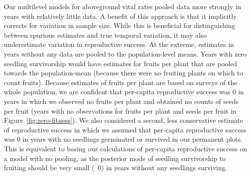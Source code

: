 \documentclass[12pt, oneside, titlepage]{article}   	%
\begin{document}
{Our multilevel models for aboveground vital rates pooled data more strongly in years with relatively little data. A benefit of this approach is that it implicitly corrects for variation in sample size. While this is beneficial for distinguishing between spurious estimates and true temporal variation, it may also underestimate variation in reproductive success. At the extreme, estimates in years without any data are pooled to the population-level means. Years with zero seedling survivorship would have estimates for fruits per plant that are pooled towards the population-mean (because there were no fruiting plants on which to count fruits). Because estimates of fruits per plant are based on surveys of the whole population, we are confident that per-capita reproductive success was 0 in years in which we observed no fruits per plant and obtained no counts of seeds per fruit (years with no observations for fruits per plant and seeds per fruit in Figure~\ref{fig:zero-fitness}). We also considered a second, less conservative estimate of reproductive success in which we assumed that per-capita reproductive success was 0 in years with no seedlings germinated or survived in our permanent plots. This is equivalent to basing our calculations of per-capita reproductive success on a model with no pooling, as the posterior mode of seedling survivorship to fruiting should be very small (~0) in years without any seedlings surviving.



}
\end{document}
